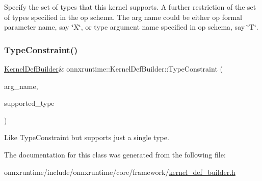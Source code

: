 Specify the set of types that this kernel supports. A further restriction of the set of types specified in the op schema. The arg name could be either op formal parameter name, say \char`\"{}\+X\char`\"{}, or type argument name specified in op schema, say \char`\"{}\+T\char`\"{}. \mbox{\label{classonnxruntime_1_1KernelDefBuilder_af70791aeb4d4368813271ad264927f0d}} 
\subsubsection{\texorpdfstring{Type\+Constraint()}{TypeConstraint()}\hspace{0.1cm}{\footnotesize\ttfamily [2/2]}}
{\footnotesize\ttfamily \mbox{\hyperlink{classonnxruntime_1_1KernelDefBuilder}{Kernel\+Def\+Builder}}\& onnxruntime\+::\+Kernel\+Def\+Builder\+::\+Type\+Constraint (\begin{DoxyParamCaption}\item[{const std\+::string \&}]{arg\+\_\+name,  }\item[{\mbox{\hyperlink{namespaceonnxruntime_ad77d0a6e838ec7da5dc35fed5ee66b49}{M\+L\+Data\+Type}}}]{supported\+\_\+type }\end{DoxyParamCaption})\hspace{0.3cm}{\ttfamily [inline]}}

Like Type\+Constraint but supports just a single type. 

The documentation for this class was generated from the following file\+:\begin{DoxyCompactItemize}
\item 
onnxruntime/include/onnxruntime/core/framework/\mbox{\hyperlink{kernel__def__builder_8h}{kernel\+\_\+def\+\_\+builder.\+h}}\end{DoxyCompactItemize}
